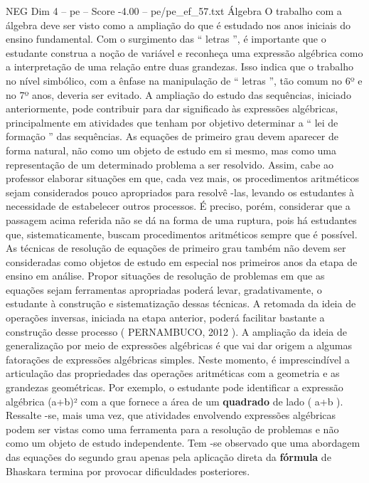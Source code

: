 \begin{textsample}{NEG Dim 4 – pe – Score -4.00 – pe/pe\_ef\_57.txt}  \label{ex:f4_neg_003}
Álgebra O trabalho com a álgebra deve ser visto como a ampliação do que é estudado nos anos iniciais do ensino fundamental.
Com o surgimento das “ letras ”, é importante que o estudante construa a noção de variável e reconheça uma expressão algébrica como a interpretação de uma relação entre duas grandezas.
Isso indica que o trabalho no nível simbólico, com a ênfase na manipulação de “ letras ”, tão comum no 6º e no 7º anos, deveria ser evitado.
A ampliação do estudo das sequências, iniciado anteriormente, pode contribuir para dar significado às expressões algébricas, principalmente em atividades que tenham por objetivo determinar a “ lei de formação ” das sequências.
As equações de primeiro grau devem aparecer de forma natural, não como um objeto de estudo em si mesmo, mas como uma representação de um determinado problema a ser resolvido.
Assim, cabe ao professor elaborar situações em que, cada vez mais, os procedimentos aritméticos sejam considerados pouco apropriados para resolvê -las, levando os estudantes à necessidade de estabelecer outros processos.
É preciso, porém, considerar que a passagem acima referida não se dá na forma de uma ruptura, pois há estudantes que, sistematicamente, buscam procedimentos aritméticos sempre que é possível.
As técnicas de resolução de equações de primeiro grau também não devem ser consideradas como objetos de estudo em especial nos primeiros anos da etapa de ensino em análise.
Propor situações de resolução de problemas em que as equações sejam ferramentas apropriadas poderá levar, gradativamente, o estudante à construção e sistematização dessas técnicas.
A retomada da ideia de operações inversas, iniciada na etapa anterior, poderá facilitar bastante a construção desse processo ( PERNAMBUCO, 2012 ).
A ampliação da ideia de generalização por meio de expressões algébricas é que vai dar origem a algumas fatorações de expressões algébricas simples.
Neste momento, é imprescindível a articulação das propriedades das operações aritméticas com a geometria e as grandezas geométricas.
Por exemplo, o estudante pode identificar a expressão algébrica (a+b)² com a que fornece a área de um \textbf{quadrado} de lado ( a+b ).
Ressalte -se, mais uma vez, que atividades envolvendo expressões algébricas podem ser vistas como uma ferramenta para a resolução de problemas e não como um objeto de estudo independente.
Tem -se observado que uma abordagem das equações do segundo grau apenas pela aplicação direta da \textbf{fórmula} de Bhaskara termina por provocar dificuldades posteriores.

\end{textsample}
